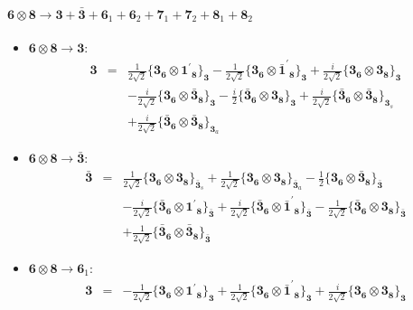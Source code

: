 \documentclass[english]{article}
\newcommand{\subcg}[3]{\big\{ {#1}\otimes{#2}\big\}^{}_{#3}}
\newcommand{\rep}[1]{\mathbf{#1}}
\begin{document}
\paragraph*{\Large $\rep{6}\otimes\rep{8}\to\rep{3}+\rep{\bar{3}}+\rep{6}_{1}+\rep{6}_{2}+\rep{7}_{1}+\rep{7}_{2}+\rep{8}_{1}+\rep{8}_{2}$}
\begin{itemize}
\item $\rep{6}\otimes\rep{8}\to\rep{3}$:
\begin{eqnarray*}
\rep{3} &=& \frac{1}{2 \sqrt{2}}\subcg{\rep{3}_{\rep{6}}}{\rep{1^{\prime}}_{\rep{8}}}{\rep{3}}-\frac{1}{2 \sqrt{2}}\subcg{\rep{3}_{\rep{6}}}{\rep{\bar{1}^{\prime}}_{\rep{8}}}{\rep{3}}+\frac{i}{2 \sqrt{2}}\subcg{\rep{3}_{\rep{6}}}{\rep{3}_{\rep{8}}}{\rep{3}} \\ 
 & & -\frac{i}{2 \sqrt{2}}\subcg{\rep{3}_{\rep{6}}}{\rep{\bar{3}}_{\rep{8}}}{\rep{3}}-\frac{i}{2}\subcg{\rep{\bar{3}}_{\rep{6}}}{\rep{3}_{\rep{8}}}{\rep{3}}+\frac{i}{2 \sqrt{2}}\subcg{\rep{\bar{3}}_{\rep{6}}}{\rep{\bar{3}}_{\rep{8}}}{\rep{3}_{s}} \\ 
 & & +\frac{i}{2 \sqrt{2}}\subcg{\rep{\bar{3}}_{\rep{6}}}{\rep{\bar{3}}_{\rep{8}}}{\rep{3}_{a}}
\end{eqnarray*}
\item $\rep{6}\otimes\rep{8}\to\rep{\bar{3}}$:
\begin{eqnarray*}
\rep{\bar{3}} &=& \frac{1}{2 \sqrt{2}}\subcg{\rep{3}_{\rep{6}}}{\rep{3}_{\rep{8}}}{\rep{\bar{3}}_{s}}+\frac{1}{2 \sqrt{2}}\subcg{\rep{3}_{\rep{6}}}{\rep{3}_{\rep{8}}}{\rep{\bar{3}}_{a}}-\frac{1}{2}\subcg{\rep{3}_{\rep{6}}}{\rep{\bar{3}}_{\rep{8}}}{\rep{\bar{3}}} \\ 
 & & -\frac{i}{2 \sqrt{2}}\subcg{\rep{\bar{3}}_{\rep{6}}}{\rep{1^{\prime}}_{\rep{8}}}{\rep{\bar{3}}}+\frac{i}{2 \sqrt{2}}\subcg{\rep{\bar{3}}_{\rep{6}}}{\rep{\bar{1}^{\prime}}_{\rep{8}}}{\rep{\bar{3}}}-\frac{1}{2 \sqrt{2}}\subcg{\rep{\bar{3}}_{\rep{6}}}{\rep{3}_{\rep{8}}}{\rep{\bar{3}}} \\ 
 & & +\frac{1}{2 \sqrt{2}}\subcg{\rep{\bar{3}}_{\rep{6}}}{\rep{\bar{3}}_{\rep{8}}}{\rep{\bar{3}}}
\end{eqnarray*}
\item $\rep{6}\otimes\rep{8}\to\rep{6}_{1}$:
\begin{eqnarray*}
\rep{3} &=& -\frac{1}{2 \sqrt{2}}\subcg{\rep{3}_{\rep{6}}}{\rep{1^{\prime}}_{\rep{8}}}{\rep{3}}+\frac{1}{2 \sqrt{2}}\subcg{\rep{3}_{\rep{6}}}{\rep{\bar{1}^{\prime}}_{\rep{8}}}{\rep{3}}+\frac{i}{2 \sqrt{2}}\subcg{\rep{3}_{\rep{6}}}{\rep{3}_{\rep{8}}}{\rep{3}} \\ 

\end{eqnarray*}
\end{itemize}
\end{document}
